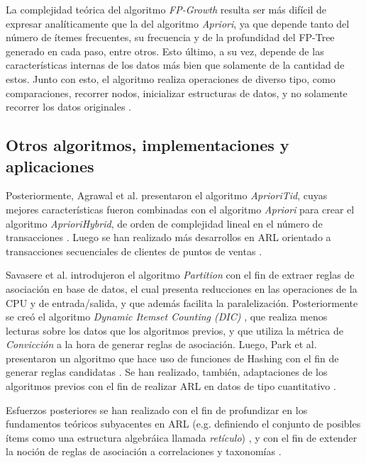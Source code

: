 La complejidad teórica del algoritmo \textit{FP-Growth} resulta ser más difícil de expresar analíticamente que la del algoritmo \textit{Apriori}, ya que depende tanto del número de ítemes frecuentes, su frecuencia y de la profundidad del FP-Tree generado en cada paso, entre otros. Esto último, a su vez, depende de las características internas de los datos más bien que solamente de la cantidad de estos. Junto con esto, el algoritmo realiza operaciones de diverso tipo, como comparaciones, recorrer nodos, inicializar estructuras de datos, y no solamente recorrer los datos originales \cite{kosters2003complexity}.

\subsection{Otros algoritmos, implementaciones y aplicaciones}

Posteriormente, Agrawal et al. presentaron el algoritmo \textit{AprioriTid}, cuyas mejores características fueron combinadas con el algoritmo \textit{Apriori} para crear el algoritmo \textit{AprioriHybrid}, de orden de complejidad lineal en el número de transacciones \cite{agrawal1994fast}. Luego se han realizado más desarrollos en ARL orientado a transacciones secuenciales de clientes de puntos de ventas \cite{agrawal1995mining}.

Savasere et al. introdujeron el algoritmo \textit{Partition} \cite{savasere1995efficient} con el fin de extraer reglas de asociación en base de datos, el cual presenta reducciones en las operaciones de la CPU y de entrada/salida, y que además facilita la paralelización. Posteriormente se creó el algoritmo \textit{Dynamic Itemset Counting (DIC)} \cite{brin1997dynamic}, que realiza menos lecturas sobre los datos que los algoritmos previos, y que utiliza la métrica de \textit{Convicción} a la hora de generar reglas de asociación. Luego, Park et al. presentaron un algoritmo que hace uso de funciones de Hashing con el fin de generar reglas candidatas \cite{park1995effective}. Se han realizado, también, adaptaciones de los algoritmos previos con el fin de realizar ARL en datos de tipo cuantitativo \cite{srikant1996mining}.

Esfuerzos posteriores se han realizado con el fin de profundizar en los fundamentos teóricos subyacentes en ARL (e.g. definiendo el conjunto de posibles ítems como una estructura algebráica llamada \textit{retículo}) \cite{zaki1998theoretical}, y con el fin de extender la noción de reglas de asociación a correlaciones \cite{brin1997beyond} y taxonomías \cite{srikant1996mining}.


